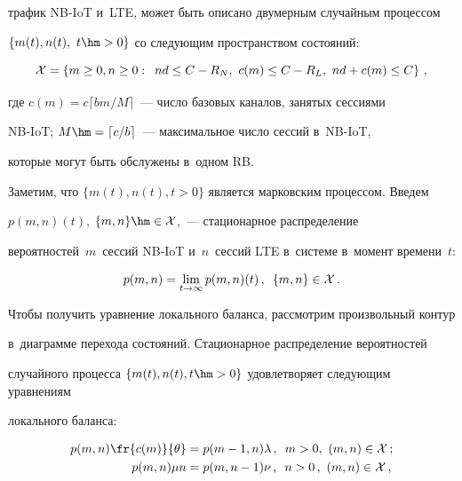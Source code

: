 трафик NB-IoT и~LTE, может быть описано двумерным случайным процессом 


$\{m(t),n(t),\ t\hm>0\}$ со следующим пространством состояний:





\noindent


\begin{equation*}


    \mathcal{X}=\left\{ m \ge 0,n \ge 0: \enskip


n d \le {C-R_{N}},\ c(m) \le {C-R_{L}},\ nd +c(m)\le {C} \right\}\,,


\end{equation*}


где $c(m)=c\lceil{}bm/M\rceil$~--- число базовых каналов, занятых сессиями 


NB-IoT; $M\hm=\lceil c/b \rceil$~--- максимальное число сессий в~NB-IoT, 


которые могут быть обслужены в~одном RB.





Заметим, что $\{m(t),n(t),t>0\}$ является марковским процессом.  Введем 


$p(m,n)(t)$, $\{m,n\}\hm\in\mathcal{X}$,~--- стационарное распределение 


вероятностей~$m$~сессий NB-IoT и~$n$~сессий LTE в~системе в~момент времени~$t$:


\begin{equation*}


    p(m,n)=\lim\limits_{t\rightarrow\infty}p(m,n)(t)\,,\enskip \{m,n\}\in\mathcal{X}\,.


\end{equation*}





Чтобы получить уравнение локального баланса, рассмотрим произвольный контур 


в~диаграмме перехода состояний.  Стационарное распределение вероятностей 


случайного процесса $\{m(t),n(t),t\hm>0\}$ удовлетворяет следующим уравнениям 


локального баланса:


\begin{align*}


    p(m,n)\fr{c(m)}{\theta}&=p(m - 1,n)\lambda\,,\enskip m > 0,\ 


    (m,n)\in\mathcal{X}\,;\\


p(m,n)\mu{n}&=p(m,n - 1)\nu\,,\enskip n>0\,,\ (m,n)\in\mathcal{X}\,,


\label{eqn:local}


\end{align*}


